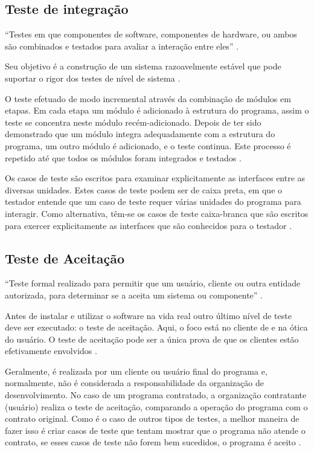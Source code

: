 \subsection{Teste de integração}

“Testes em que componentes de software, componentes de hardware, ou ambos são combinados e testados para avaliar a interação entre eles” \cite{ieee}.

Seu objetivo é a construção de um sistema razoavelmente estável que pode suportar o rigor dos testes de nível de sistema \cite[pág.~18]{naik2008}.

O teste  efetuado de modo incremental através da combinação de módulos em etapas. Em cada etapa um módulo é adicionado à estrutura do programa, assim o teste se concentra neste módulo recém-adicionado. Depois de ter sido demonstrado que um módulo integra adequadamente com a estrutura do programa, um outro módulo é adicionado, e o teste continua. Este processo é repetido até que todos os módulos foram integrados e testados \cite[pág.~134]{lewis2009}.

Os casos de teste são escritos para examinar explicitamente as interfaces entre as diversas unidades. Estes casos de teste podem ser de caixa preta, em que o testador entende que um caso de teste requer várias unidades do programa para interagir. Como alternativa, têm-se os casos de teste caixa-branca que são escritos para exercer explicitamente as interfaces que são conhecidos para o testador \cite{williams2006}.

\subsection{Teste de Aceitação}

“Teste formal realizado para permitir que um usuário, cliente ou outra entidade autorizada, para determinar se a aceita um sistema ou componente” \cite{ieee}.

Antes de instalar e utilizar o software na vida real outro último nível de teste deve ser executado: o teste de aceitação. Aqui, o foco está no cliente de e na ótica do usuário. O teste de aceitação pode ser a única prova de que os clientes estão efetivamente envolvidos \cite[pág.~61]{spillner2014}.

Geralmente, é realizada por um cliente ou usuário final do programa e, normalmente, não é considerada a responsabilidade da organização de desenvolvimento. No caso de um programa contratado, a organização contratante (usuário) realiza o teste de aceitação, comparando a operação do programa com o contrato original. Como é o caso de outros tipos de testes, a melhor maneira de fazer isso é criar casos de teste que tentam mostrar que o programa não atende o contrato, se esses casos de teste não forem bem sucedidos, o programa é aceito \cite[pág.~104]{myers2004}.  


